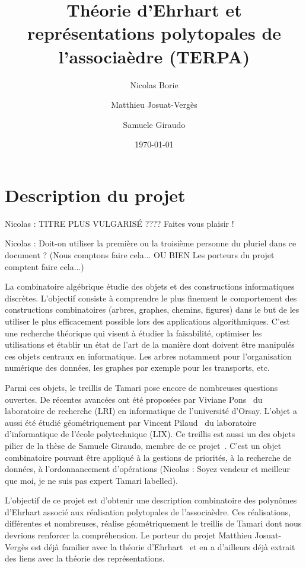 \documentclass[a4paper, 10pt]{article}
\title{Théorie d'Ehrhart et représentations polytopales de
l'associaèdre (TERPA)}
\date{\today}
\author{Nicolas Borie \and Matthieu Josuat-Verg\`es \and Samuele Giraudo}
\numberwithin{equation}{subsection}
\begin{document}
\maketitle

\section{Description du projet}

Nicolas : TITRE PLUS VULGARISÉ ???? Faites vous plaisir !

Nicolas : Doit-on utiliser la première ou la troisième personne du pluriel dans ce document ?
(Nous comptons faire cela... OU BIEN Les porteurs du projet comptent faire cela...)


La combinatoire algébrique étudie des objets et des constructions
informatiques discrètes. L'objectif consiste à comprendre le plus
finement le comportement des constructions combinatoires (arbres,
graphes, chemins, figures) dans le but de les utiliser le plus
efficacement possible lors des applications algorithmiques. C'est une
recherche théorique qui visent à étudier la faisabilité, optimiser les
utilisations et établir un état de l'art de la manière dont doivent
être manipulés ces objets centraux en informatique. Les arbres
notamment pour l'organisation numérique des données, les graphes par
exemple pour les transports, etc.



Parmi ces objets, le treillis de Tamari pose encore de nombreuses
questions ouvertes. De récentes avancées ont été proposées par Viviane
Pons~\cite{MR3345297} du laboratoire de recherche (LRI) en
informatique de l'université d'Orsay. L'objet a aussi été étudié
géométriquement par Vincent Pilaud~\cite{MR3327085} du laboratoire
d'informatique de l'école polytechnique (LIX). Ce treillis est aussi
un des objets pilier de la thèse de Samuele Giraudo, membre de ce
projet~\cite{MR2887627}. C'est un objet combinatoire pouvant être
appliqué à la gestions de priorités, à la recherche de données, à
l'ordonnancement d'opérations (Nicolas : Soyez vendeur et meilleur que
moi, je ne suis pas expert Tamari labelled).



L'objectif de ce projet est d'obtenir une description combinatoire des
polynômes d'Ehrhart associé aux réalisation polytopales de
l'associaèdre. Ces réalisations, différentes et nombreuses, réalise
géométriquement le treillis de Tamari dont nous devrions renforcer la
compréhension. Le porteur du projet Matthieu Josuat-Vergès est déjà
familier avec la théorie d'Ehrhart~\cite{MR3484760} et en a d'ailleurs
déjà extrait des liens avec la théorie des représentations.
\end{document}
